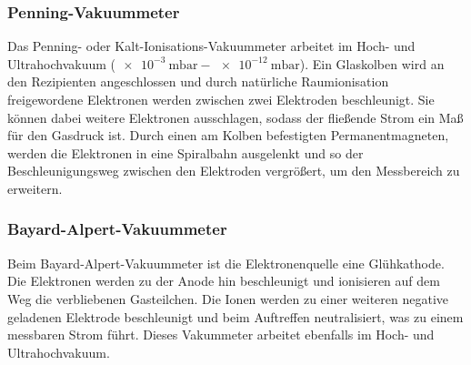 \subsubsection{Penning-Vakuummeter}

Das Penning- oder Kalt-Ionisations-Vakuummeter arbeitet im Hoch- und Ultrahochvakuum ($\SI{e-3}{\milli\bar} - \SI{e-12}{\milli\bar}$). Ein Glaskolben wird an den Rezipienten angeschlossen und durch natürliche Raumionisation freigewordene Elektronen werden zwischen zwei Elektroden beschleunigt. Sie können dabei weitere Elektronen ausschlagen, sodass der fließende Strom ein Maß für den Gasdruck ist. Durch einen am Kolben befestigten Permanentmagneten, werden die Elektronen in eine Spiralbahn ausgelenkt und so der Beschleunigungsweg zwischen den Elektroden vergrößert, um den Messbereich zu erweitern.\cite{Jena}

\subsubsection{Bayard-Alpert-Vakuummeter}

Beim Bayard-Alpert-Vakuummeter ist die Elektronenquelle eine Glühkathode. Die Elektronen werden zu der Anode hin beschleunigt und ionisieren auf dem Weg die verbliebenen Gasteilchen. Die Ionen werden zu einer weiteren negative geladenen Elektrode beschleunigt und beim Auftreffen neutralisiert, was zu einem messbaren Strom führt. Dieses Vakummeter arbeitet ebenfalls im Hoch- und Ultrahochvakuum.\cite{Spektrum}
